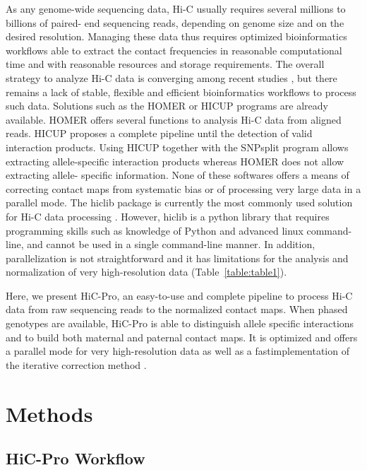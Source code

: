 As any genome-wide sequencing data, Hi-C usually requires several millions to
billions of paired- end sequencing reads, depending on genome size and on the
desired resolution. Managing these data thus requires optimized bioinformatics
workflows able to extract the contact frequencies in reasonable computational
time and with reasonable resources and storage requirements. The overall
strategy to analyze Hi-C data is converging among recent studies
\citep{lajoie:hitchhiker}, but there remains a lack of stable, flexible and
efficient bioinformatics workflows to process such data. Solutions such as the
HOMER \citep{heinz:simple} or HICUP programs are already available. HOMER
offers several functions to analysis Hi-C data from aligned reads. HICUP
proposes a complete pipeline until the detection of valid interaction
products. Using HICUP together with the SNPsplit program allows extracting
allele-specific interaction products whereas HOMER does not allow extracting
allele- specific information. None of these softwares offers a means of
correcting contact maps from systematic bias or of processing very large data
in a parallel mode. The hiclib package is currently the most commonly used
solution for Hi-C data processing \citep{imakaev:iterative}. However, hiclib
is a python library that requires programming skills such as knowledge of
Python and advanced linux command-line, and cannot be used in a single
command-line manner. In addition, parallelization is not straightforward and
it has limitations for the analysis and normalization of very high-resolution
data (Table~\ref{table:table1}).

Here, we present HiC-Pro, an easy-to-use and complete pipeline to process Hi-C
data from raw sequencing reads to the normalized contact maps. When phased
genotypes are available, HiC-Pro is able to distinguish allele specific
interactions and to build both maternal and paternal contact maps. It is
optimized and offers a parallel mode for very high-resolution data as well as
a fastimplementation of the iterative correction method
\citep{imakaev:iterative}.

\section{Methods}

\subsection{HiC-Pro Workflow}

